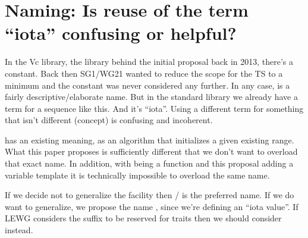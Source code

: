 \section{Naming: Is reuse of the term “iota” confusing or helpful?}

In the Vc library, the library behind the initial proposal back in 2013,
there's a  constant.
Back then SG1/WG21 wanted to reduce the scope for the TS to a minimum and the
constant was never considered any further.
In any case,  is a fairly descriptive/elaborate name.
But in the standard library we already have a term for a sequence like this.
And it's “iota”.
Using a different term for something that isn't different (concept) is
confusing and incoherent.

 has an existing meaning, as an algorithm that initializes a
given existing range.
What this paper proposes is sufficiently different that we don't want to
overload that exact name.
In addition, with  being a function and this proposal adding a
variable template it is technically impossible to overload the same name.

If we decide not to generalize the facility then \std{} /
\stdsimd{} is the preferred name.
If we do want to generalize, we propose the name \std{}, since we're
defining an “iota value”.
If LEWG considers the  suffix to be reserved for traits then we should
consider \std{} instead.

